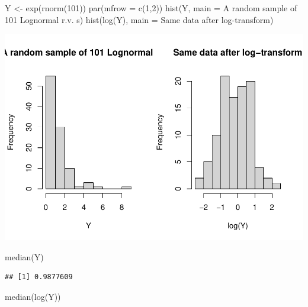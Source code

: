 \documentclass[
]{book}
\newenvironment{Shaded}{\begin{snugshade}}{\end{snugshade}}
\newcommand{\AttributeTok}[1]{\textcolor[rgb]{0.77,0.63,0.00}{#1}}
\newcommand{\DecValTok}[1]{\textcolor[rgb]{0.00,0.00,0.81}{#1}}
\newcommand{\FunctionTok}[1]{\textcolor[rgb]{0.00,0.00,0.00}{#1}}
\newcommand{\NormalTok}[1]{#1}
\newcommand{\OtherTok}[1]{\textcolor[rgb]{0.56,0.35,0.01}{#1}}
\newcommand{\StringTok}[1]{\textcolor[rgb]{0.31,0.60,0.02}{#1}}
\begin{document}
\begin{Shaded}
\begin{Highlighting}[]
\NormalTok{Y }\OtherTok{\textless{}{-}} \FunctionTok{exp}\NormalTok{(}\FunctionTok{rnorm}\NormalTok{(}\DecValTok{101}\NormalTok{))}
\FunctionTok{par}\NormalTok{(}\AttributeTok{mfrow =} \FunctionTok{c}\NormalTok{(}\DecValTok{1}\NormalTok{,}\DecValTok{2}\NormalTok{))}
\FunctionTok{hist}\NormalTok{(Y, }\AttributeTok{main =} \StringTok{\textquotesingle{}A random sample of 101 Lognormal r.v. s\textquotesingle{}}\NormalTok{)}
\FunctionTok{hist}\NormalTok{(}\FunctionTok{log}\NormalTok{(Y), }\AttributeTok{main =} \StringTok{\textquotesingle{}Same data after log{-}transform\textquotesingle{}}\NormalTok{)}
\end{Highlighting}
\end{Shaded}

\includegraphics{04-Non-Normal-Responses_files/figure-latex/unnamed-chunk-1-1.pdf}

\begin{Shaded}
\begin{Highlighting}[]
\FunctionTok{median}\NormalTok{(Y)}
\end{Highlighting}
\end{Shaded}

\begin{verbatim}
## [1] 0.9877609
\end{verbatim}

\begin{Shaded}
\begin{Highlighting}[]
\FunctionTok{median}\NormalTok{(}\FunctionTok{log}\NormalTok{(Y))}
\end{Highlighting}
\end{Shaded}
\end{document}
